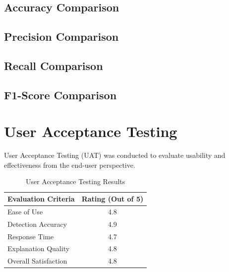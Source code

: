 \documentclass[12pt]{report}
\begin{document}
\subsection{Accuracy Comparison}


\subsection{Precision Comparison}


\subsection{Recall Comparison}


\subsection{F1-Score Comparison}


\section{User Acceptance Testing}

User Acceptance Testing (UAT) was conducted to evaluate usability and effectiveness from the end-user perspective.

\begin{table}[H]
\centering
\caption{User Acceptance Testing Results}
\begin{tabular}{|p{6cm}|c|}
\hline
Evaluation Criteria & Rating (Out of 5) \\
\hline
Ease of Use & 4.8 \\
\hline
Detection Accuracy & 4.9 \\
\hline
Response Time & 4.7 \\
\hline
Explanation Quality & 4.8 \\
\hline
Overall Satisfaction & 4.8 \\
\hline
\end{tabular}
\end{table}
\end{document}
